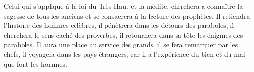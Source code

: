 Celui qui s’applique à la loi du Très-Haut et la médite,
	cherchera à connaître la sagesse de tous les anciens
	et se consacrera à la lecture des prophètes.
Il retiendra l’histoire des hommes célèbres,
	il pénètrera dans les détours des paraboles,
	il cherchera le sens caché des proverbes,
	il retournera dans sa tête les énigmes des paraboles.
Il aura une place au service des grands, il se fera remarquer par les chefs,
	il voyagera dans les pays étrangers,
	car il a l’expérience du bien et du mal que font les hommes.
